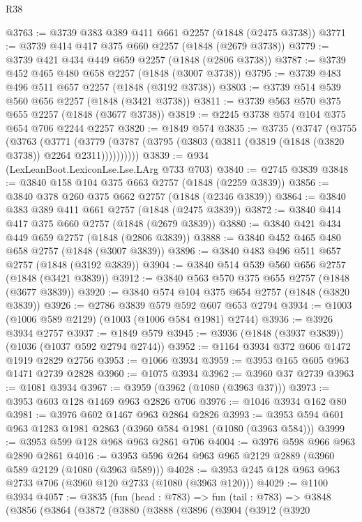 \begin{lexlean}{R38}
\begin{coremodule}
@3763 := @3739 @383 @389 @411 @661 @2257 (@1848 (@2475 @3738))
@3771 := @3739 @414 @417 @375 @660 @2257 (@1848 (@2679 @3738))
@3779 := @3739 @421 @434 @449 @659 @2257 (@1848 (@2806 @3738))
@3787 := @3739 @452 @465 @480 @658 @2257 (@1848 (@3007 @3738))
@3795 := @3739 @483 @496 @511 @657 @2257 (@1848 (@3192 @3738))
@3803 := @3739 @514 @539 @560 @656 @2257 (@1848 (@3421 @3738))
@3811 := @3739 @563 @570 @375 @655 @2257 (@1848 (@3677 @3738))
@3819 := @2245 @3738 @574 @104 @375 @654 @706 @2244 @2257
@3820 := @1849 @574
@3835 := @3735
    (@3747
      (@3755
        (@3763
          (@3771
            (@3779 (@3787 (@3795 (@3803 (@3811 (@3819 (@1848 (@3820 @3738)) @2264 @2311))))))))))
@3839 := @934 (LexLeanBoot.LexiconLse.Lse.LArg @733 @703)
@3840 := @2745 @3839
@3848 := @3840 @158 @104 @375 @663 @2757 (@1848 (@2259 @3839))
@3856 := @3840 @378 @260 @375 @662 @2757 (@1848 (@2346 @3839))
@3864 := @3840 @383 @389 @411 @661 @2757 (@1848 (@2475 @3839))
@3872 := @3840 @414 @417 @375 @660 @2757 (@1848 (@2679 @3839))
@3880 := @3840 @421 @434 @449 @659 @2757 (@1848 (@2806 @3839))
@3888 := @3840 @452 @465 @480 @658 @2757 (@1848 (@3007 @3839))
@3896 := @3840 @483 @496 @511 @657 @2757 (@1848 (@3192 @3839))
@3904 := @3840 @514 @539 @560 @656 @2757 (@1848 (@3421 @3839))
@3912 := @3840 @563 @570 @375 @655 @2757 (@1848 (@3677 @3839))
@3920 := @3840 @574 @104 @375 @654 @2757 (@1848 (@3820 @3839))
@3926 := @2786 @3839 @579 @592 @607 @653 @2794
@3934 := @1003 (@1006 @589 @2129) (@1003 (@1006 @584 @1981) @2744)
@3936 := @3926 @3934 @2757
@3937 := @1849 @579
@3945 := @3936 (@1848 (@3937 @3839)) (@1036 (@1037 @592 @2794 @2744))
@3952 := @1164 @3934 @372 @606 @1472 @1919 @2829 @2756
@3953 := @1066 @3934
@3959 := @3953 @165 @605 @963 @1471 @2739 @2828
@3960 := @1075 @3934
@3962 := @3960 @37 @2739
@3963 := @1081 @3934
@3967 := @3959 (@3962 (@1080 (@3963 @37)))
@3973 := @3953 @603 @128 @1469 @963 @2826 @706
@3976 := @1046 @3934 @162 @80
@3981 := @3976 @602 @1467 @963 @2864 @2826
@3993 := @3953 @594 @601 @963 @1283 @1981 @2863 (@3960 @584 @1981 (@1080 (@3963 @584)))
@3999 := @3953 @599 @128 @968 @963 @2861 @706
@4004 := @3976 @598 @966 @963 @2890 @2861
@4016 := @3953 @596 @264 @963 @965 @2129 @2889 (@3960 @589 @2129 (@1080 (@3963 @589)))
@4028 := @3953 @245 @128 @963 @963 @2733 @706 (@3960 @120 @2733 (@1080 (@3963 @120)))
@4029 := @1100 @3934
@4057 := @3835
    (fun (head : @783) =>
    fun (tail : @783) =>
    @3848
      (@3856
        (@3864
          (@3872
            (@3880
              (@3888
                (@3896
                  (@3904
                    (@3912
                      (@3920

\end{coremodule}
\end{lexlean}
